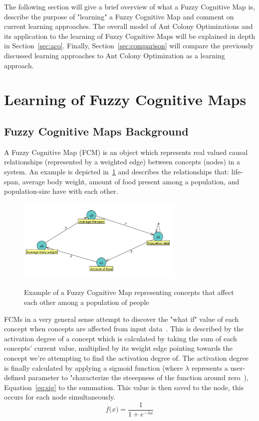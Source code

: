 \documentclass{umm-senior-sem}
\begin{document}
The following section will give a brief overview of what a Fuzzy Cognitive Map is, describe the purpose of "learning" a Fuzzy Cognitive Map and comment on current learning approaches. The overall model of Ant Colony Optimizations and its application to the learning of Fuzzy Cognitive Maps will be explained in depth in Section~\ref{sec:aco}. Finally, Section~\ref{sec:comparison} will compare the previously discussed learning approaches to Ant Colony Optimization as a learning approach.

\section{Learning of Fuzzy Cognitive Maps}
\label{fcm}
\subsection{Fuzzy Cognitive Maps Background}
A Fuzzy Cognitive Map (FCM) is an object which represents real valued causal relationships (represented by a weighted edge) between concepts (nodes) in a system. An example is depicted in~\ref{fig:fcm} and describes the relationships that: life-span, average body weight, amount of food present among a population, and population-size have with each other. 
\begin{figure}
\includegraphics[width = 8cm, height = 4cm]{images/population.png}
\label{fig:fcm}
\caption{Example of a Fuzzy Cognitive Map representing concepts that affect each other among a population of people}
\end{figure}
FCMs in a very general sense attempt to discover the "what if" value of each concept when concepts are affected from input data~\cite{FCMbg:1999}. This is described by the activation degree of a concept which is calculated by taking the sum of each concepts' current value, multiplied by its weight edge pointing towards the concept we're attempting to find the activation degree of. The activation degree is finally calculated by applying a sigmoid function (where $\lambda$ represents a user-defined parameter to "characterize the steeepness of the function around zero~\cite{main:2012}), Equation~\ref{eq:sig} to the summation. This value is then saved to the node, this occurs for each node simultaneously.
\begin{equation}
\label{eq:sig}
 f \big(x\big) = \frac{1}{1+ e^{-\lambda x} } 
\end{equation}
\end{document}
